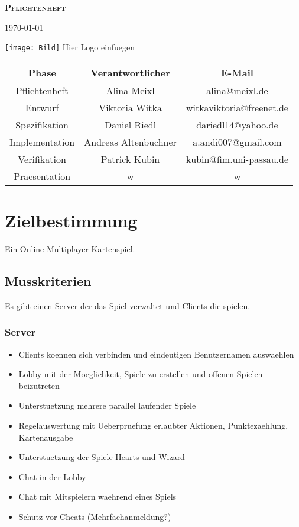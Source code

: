 \documentclass{article}
\begin{document}
\begin{titlepage}

\begin{center}
\textbf{\textsc{\LARGE Pflichtenheft}}

{\large \today}

\vspace{6cm}
\texttt{[image: Bild]}
Hier Logo einfuegen

\vspace{6cm}

\begin{tabular}{|c|c|c|}\hline
   Phase & Verantwortlicher & E-Mail \\ \hline\hline
   Pflichtenheft & Alina  Meixl  &  alina@meixl.de \\ \hline
   Entwurf & Viktoria Witka & witkaviktoria@freenet.de \\ \hline
   Spezifikation & Daniel Riedl & dariedl14@yahoo.de \\ \hline
   Implementation & Andreas Altenbuchner& a.andi007@gmail.com\\ \hline
   Verifikation &Patrick Kubin & kubin@fim.uni-passau.de\\ \hline
   Praesentation & w& w\\ \hline
 \end{tabular}

\end{center}

\end{titlepage}


\tableofcontents
\newpage

\section{Zielbestimmung}
Ein Online-Multiplayer Kartenspiel.

\subsection{Musskriterien}
Es gibt einen \gls{Server} der das Spiel verwaltet und \glspl{Client} die spielen.
\subsubsection{\gls{Server}}
\begin{itemize}
	\item \glspl{Client} koennen sich verbinden und eindeutigen Benutzernamen auswaehlen
	\item \gls{Lobby} mit der Moeglichkeit, Spiele zu erstellen und offenen Spielen beizutreten
	\item Unterstuetzung mehrere parallel laufender Spiele
	\item Regelauswertung mit Ueberpruefung erlaubter Aktionen, Punktezaehlung, Kartenausgabe
	\item Unterstuetzung der Spiele Hearts und Wizard
	\item Chat in der \gls{Lobby}
	\item Chat mit Mitspielern waehrend eines Spiels
	\item Schutz vor Cheats (Mehrfachanmeldung?)
\end{itemize}
\end{document}
